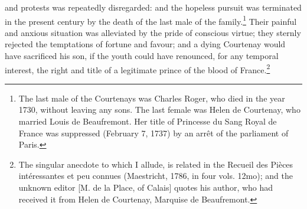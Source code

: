 and protests was repeatedly disregarded: and the hopeless pursuit was terminated in the present century by the death of the last male of the family.\footnote{The last male of the Courtenays was Charles Roger, who died in the year 1730, without leaving any sons. The last female was Helen de Courtenay, who married Louis de Beaufremont. Her title of Princesse du Sang Royal de France was suppressed (February 7, 1737) by an arrêt of the parliament of Paris.} Their painful and anxious situation was alleviated by the pride of conscious virtue; they sternly rejected the temptations of fortune and favour; and a dying Courtenay would have sacrificed his son, if the youth could have renounced, for any temporal interest, the right and title of a legitimate prince of the blood of France.\footnote{The singular anecdote to which I allude, is related in the Recueil des Pièces intéressantes et peu connues (Maestricht, 1786, in four vols. 12mo); and the unknown editor [M. de la Place, of Calais] quotes his author, who had received it from Helen de Courtenay, Marquise de Beaufremont.}

